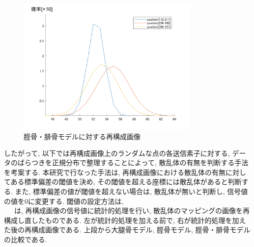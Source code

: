\begin{figure}[H]
  \begin{center}
    \includegraphics[width=90mm]{fig/kaiseki3data.pdf}
  \end{center}
  \caption{脛骨・腓骨モデルに対する再構成画像}
\end{figure}
したがって, 以下では再構成画像上のランダムな点の各送信素子に対する, データのばらつきを正規分布で整理することによって, 散乱体の有無を判断する手法を考案する. 本研究で行なった手法は, 再構成画像における散乱体の有無に対してある標準偏差の閾値を決め, その閾値を超える座標には散乱体があると判断する. また, 標準偏差の値が閾値を超えない場合は, 散乱体が無いと判断し, 信号値の値を0に変更する. 閾値の設定方法は, \\
\ \ \ は, 再構成画像の信号値に統計的処理を行い, 散乱体のマッピングの画像を再構成し直したものである. 左が統計的処理を加える前で, 右が統計的処理を加えた後の再構成画像である. 上段から大腿骨モデル, 脛骨モデル, 脛骨・腓骨モデルの比較である. 

